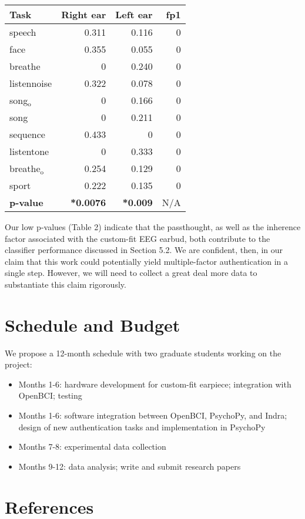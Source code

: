 \documentclass[11pt]{article}
\begin{document}
\begin{center}
\begin{tabular}{lrrr}
Task & Right ear & Left ear & fp1\\
\hline
speech & 0.311 & 0.116 & 0\\
face & 0.355 & 0.055 & 0\\
breathe & 0 & 0.240 & 0\\
listennoise & 0.322 & 0.078 & 0\\
song\(_{\text{o}}\) & 0 & 0.166 & 0\\
song & 0 & 0.211 & 0\\
sequence & 0.433 & 0 & 0\\
listentone & 0 & 0.333 & 0\\
breathe\(_{\text{o}}\) & 0.254 & 0.129 & 0\\
sport & 0.222 & 0.135 & 0\\
\hline
\textbf{p-value} & \textbf{*0.0076} & \textbf{*0.009} & N/A\\
\end{tabular}
\end{center}
Our low p-values (Table 2) indicate that the passthought, as well as the inherence
factor associated with the custom-fit EEG earbud, both contribute to the classifier
performance discussed in Section 5.2. We are confident, then, in our claim that this work
could potentially yield multiple-factor authentication in a single step. However, we
will need to collect a great deal more data to substantiate this claim rigorously.

\section{Schedule and Budget}
\label{sec:org2f6eb19}
We propose a 12-month schedule with two graduate students working on the
project:

\begin{itemize}
\item Months 1-6: hardware development for custom-fit earpiece; integration with OpenBCI; testing
\item Months 1-6: software integration between OpenBCI, PsychoPy, and Indra; design of new authentication tasks and implementation in PsychoPy
\item Months 7-8: experimental data collection
\item Months 9-12: data analysis; write and submit research papers
\end{itemize}
\section{References}
\label{sec:org72eb964}
\end{document}
